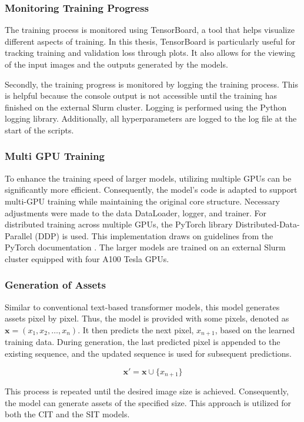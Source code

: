     \subsubsection{Monitoring Training Progress}
    
    The training process is monitored using TensorBoard, a tool that helps visualize different aspects of training. In this thesis, TensorBoard is particularly useful for tracking training and validation loss through plots. It also allows for the viewing of the input images and the outputs generated by the models.

    Secondly, the training progress is monitored by logging the training process. This is helpful because the console output is not accessible until the training has finished on the external Slurm cluster. Logging is performed using the Python logging library. Additionally, all hyperparameters are logged to the log file at the start of the scripts.



    \subsubsection{Multi GPU Training}
    
    To enhance the training speed of larger models, utilizing multiple GPUs can be significantly more efficient. Consequently, the model's code is adapted to support multi-GPU training while maintaining the original core structure. Necessary adjustments were made to the data DataLoader, logger, and trainer. For distributed training across multiple GPUs, the PyTorch library Distributed-Data-Parallel (DDP) is used. This implementation draws on guidelines from the PyTorch documentation \autocite{Subramanian2023}. The larger models are trained on an external Slurm cluster equipped with four A100 Tesla GPUs.

    \subsubsection{Generation of Assets}

    Similar to conventional text-based transformer models, this model generates assets pixel by pixel. Thus, the model is provided with some pixels, denoted as \(\mathbf{x} = (x_1, x_2, \ldots, x_n)\). It then predicts the next pixel, \(x_{n+1}\), based on the learned training data. During generation, the last predicted pixel is appended to the existing sequence, and the updated sequence is used for subsequent predictions.

    \[
        \mathbf{x}' = \mathbf{x} \cup \{x_{n+1}\}
    \]
    
    This process is repeated until the desired image size is achieved. Consequently, the model can generate assets of the specified size. This approach is utilized for both the CIT and the SIT models.
